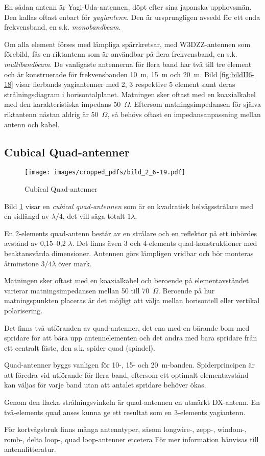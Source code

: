 En sådan antenn är Yagi-Uda-antennen, döpt efter sina japanska upphovsmän.
Den kallas oftast enbart för \emph{yagiantenn}.
Den är ursprungligen avsedd för ett enda frekvensband, en s.k.
\emph{monobandbeam}.

Om alla element förses med lämpliga spärrkretsar, med W3DZZ-antennen som
förebild, fås en riktantenn som är användbar på flera frekvensband, en s.k.
\emph{multibandbeam}.
De vanligaste antennerna för flera band har två till tre element och är
konstruerade för frekvensbanden 10~m, 15~m och 20~m.
Bild \ref{fig:bildII6-18} visar flerbands yagiantenner med 2, 3 respektive 5
element samt deras strålningsdiagram i horisontalplanet.
Matningen sker oftast med en koaxialkabel med den karakteristiska impedans 50~\(\Omega\).
Eftersom matningsimpedansen för själva riktantenn nästan aldrig är
50~\(\Omega\), så behövs oftast en impedansanpassning mellan antenn och kabel.

\subsection{Cubical Quad-antenner}

\begin{figure}
  \texttt{[image: images/cropped\_pdfs/bild\_2\_6-19.pdf]}
  \caption{Cubical Quad-antenner}
  \label{fig:bildII6-19}
\end{figure}

Bild \ref{fig:bildII6-19} visar en \emph{cubical quad-antennen} som är en
kvadratisk helvågsstrålare med en sidlängd av \(\lambda/4\), det vill säga totalt
\(1\lambda\).

En 2-elements quad-antenn består av en strålare och en reflektor på
ett inbördes avstånd av 0,15--0,2 \(\lambda\).
Det finns även 3 och 4-elements quad-konstruktioner med beaktansvärda
dimensioner.
Antennen görs lämpligen vridbar och bör monteras åtminstone \(3/4 \lambda\)
över mark.

Matningen sker oftast med en koaxialkabel och beroende på elementavståndet
varierar matningsimpedansen mellan 50 till 70~\(\Omega\).
Beroende på hur matningspunkten placeras är det möjligt att välja mellan
horisontell eller vertikal polarisering.

Det finns två utföranden av quad-antenner, det ena med en bärande bom
med spridare för att bära upp antennelementen och det andra med bara
spridare från ett centralt fäste, den s.k. spider quad (spindel).

Quad-antenner byggs vanligen för 10-, 15- och 20~m-banden.
Spiderprincipen är att föredra vid utförande för flera band, eftersom ett
optimalt elementavstånd kan väljas för varje band utan att antalet spridare
behöver ökas.

Genom den flacka strålningsvinkeln är quad-antennen en utmärkt DX-antenn.
En två-elements quad anses kunna ge ett resultat som en 3-elements yagiantenn.

För kortvågsbruk finns många antenntyper, såsom longwire-, zepp-,
windom-, romb-, delta loop-, quad loop-antenner etcetera För mer
information hänvisas till antennlitteratur.
